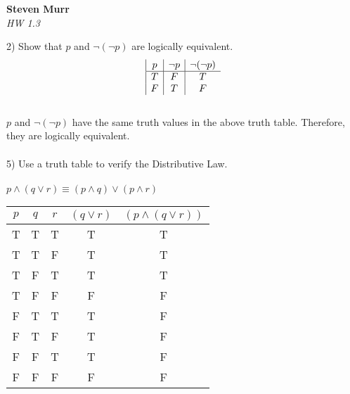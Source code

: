 \documentclass{article}
\begin{document}
\setcounter{totalnumber}{5}
   \begin{flushright}
      \Large\textbf{Steven Murr}\\
      \large\textit{HW 1.3}
   \end{flushright}
\begin{flushleft}
\makeatletter%
\setlength{\@fptop}{5pt}
\makeatother
\marginpar{\setlength\parindent{0pt}}2) Show that $p$ and $\neg(\neg p)$ are logically equivalent.
\begin{displaymath}
\begin{array} {| c | c| c}

$$p$$
& $$\neg p$$
& $$\neg(\neg p)$$ \\ \hline
T & F & T \\
F & T & F \\
\end{array}
\end{displaymath}
~\\
\setlength\parindent{24pt}$p$ and $\neg(\neg p)$ have the same truth values in the above truth table.  Therefore, \\
\setlength\parindent{24pt}they are logically equivalent.
~\\
~\\
\setlength\parindent{0pt}5) Use a truth table to verify the Distributive Law.\\
~\\\setlength\parindent{24pt} $p \land (q \lor r) \equiv (p \land q) \lor (p \land r)$ \\ 

\begin{table}[ht]

\begin{tabular}{|c|c|c||c|c|}

$ p $ & $ q $ & $ r $ & $ (q \vee r) $ & $ (p \wedge (q \vee r)) $ \\
\hline
T & T & T & T & T \\
\hline
T & T & F & T & T \\
\hline
T & F & T & T & T \\
\hline
T & F & F & F & F \\
\hline
F & T & T & T & F \\
\hline
F & T & F & T & F \\
\hline
F & F & T & T & F \\
\hline
F & F & F & F & F \\
\end{tabular}
\label{table:tt1}
\end{table}


\end{flushleft}
\end{document}
